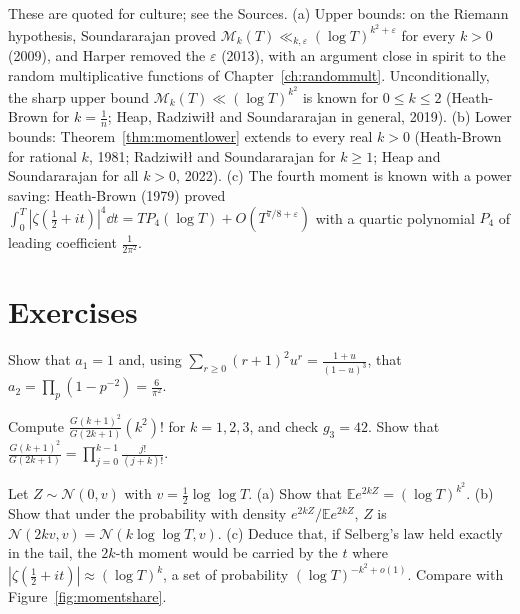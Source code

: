 \begin{remark}
These are quoted for culture; see the Sources. (a) Upper bounds: on the Riemann hypothesis, Soundararajan proved $\mathcal M_k(T)\ll_{k,\varepsilon}(\log T)^{k^2+\varepsilon}$ for every $k>0$ (2009), and Harper removed the $\varepsilon$ (2013), with an argument close in spirit to the random multiplicative functions of Chapter~\ref{ch:randommult}. Unconditionally, the sharp upper bound $\mathcal M_k(T)\ll(\log T)^{k^2}$ is known for $0\le k\le2$ (Heath-Brown for $k=\frac1n$; Heap, Radziwi\l\l{} and Soundararajan in general, 2019). (b) Lower bounds: Theorem~\ref{thm:momentlower} extends to every real $k>0$ (Heath-Brown for rational $k$, 1981; Radziwi\l\l{} and Soundararajan for $k\ge1$; Heap and Soundararajan for all $k>0$, 2022). (c) The fourth moment is known with a power saving: Heath-Brown (1979) proved $\int_0^T|\zeta(\frac12+it)|^4\dd t=TP_4(\log T)+O(T^{7/8+\varepsilon})$ with a quartic polynomial $P_4$ of leading coefficient $\frac1{2\pi^2}$.
\end{remark}

\section{Exercises}

\begin{exercise}[$\star$]\label{ex:ak}
Show that $a_1=1$ and, using $\sum_{r\ge0}(r+1)^2u^r=\frac{1+u}{(1-u)^3}$, that $a_2=\prod_p(1-p^{-2})=\frac6{\pi^2}$.
\end{exercise}

\begin{exercise}[$\star$]\label{ex:gk}
Compute $\frac{G(k+1)^2}{G(2k+1)}(k^2)!$ for $k=1,2,3$, and check $g_3=42$. Show that $\frac{G(k+1)^2}{G(2k+1)}=\prod_{j=0}^{k-1}\frac{j!}{(j+k)!}$.
\end{exercise}

\begin{exercise}[$\star\star$]\label{ex:lognormal}
Let $Z\sim\mathcal N(0,v)$ with $v=\frac12\log\log T$. (a) Show that $\mathbb Ee^{2kZ}=(\log T)^{k^2}$. (b) Show that under the probability with density $e^{2kZ}/\mathbb Ee^{2kZ}$, $Z$ is $\mathcal N(2kv,v)=\mathcal N(k\log\log T,v)$. (c) Deduce that, if Selberg's law held exactly in the tail, the $2k$-th moment would be carried by the $t$ where $|\zeta(\frac12+it)|\approx(\log T)^k$, a set of probability $(\log T)^{-k^2+o(1)}$. Compare with Figure~\ref{fig:momentshare}.
\end{exercise}

